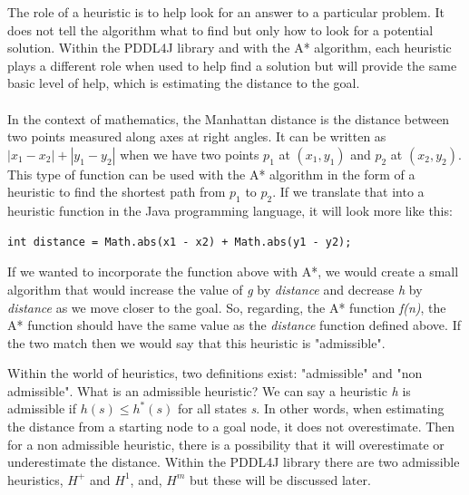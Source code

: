 The role of a heuristic is to help look for an answer to a particular problem. It does not tell the algorithm what to find but only how to look for a potential solution. Within the PDDL4J library and with the A* algorithm, each heuristic plays a different role when used to help find a solution but will provide the same basic level of help, which is estimating the distance to the goal. 
\\
\\
In the context of mathematics, the Manhattan distance is the distance between two points measured along axes at right angles\cite{ManhattanDistance}. It can be written as $|x_1 - x_2| + |y_1 - y_2|$ when we have two points $p_1$ at $(x_1, y_1)$ and $p_2$ at $(x_2, y_2)$. This type of function can be used with the A* algorithm in the form of a heuristic to find the shortest path from $p_1$ to $p_2$. If we translate that into a heuristic function in the Java programming language, it will look more like this:
\begin{verbatim}
int distance = Math.abs(x1 - x2) + Math.abs(y1 - y2);
\end{verbatim}

If we wanted to incorporate the function above with A*, we would create a small algorithm that would increase the value of \textit{g} by \textit{distance} and decrease \textit{h} by \textit{distance} as we move closer to the goal. So, regarding, the A* function \textit{f(n)}, the A* function should have the same value as the \textit{distance} function defined above. If the two match then we would say that this heuristic is "admissible". 

Within the world of heuristics, two definitions exist: "admissible" and "non admissible". What is an admissible heuristic? We can say a heuristic \textit{h} is admissible if $h(s) \leq h^*(s)$ for all states \textit{s}. In other words, when estimating the distance from a starting node to a goal node, it does not overestimate. Then for a non admissible heuristic, there is a possibility that it will overestimate or underestimate the distance. Within the PDDL4J library there are two admissible heuristics, $H^+$ and $H^1$, and, $H^m$ but these will be discussed later. 

